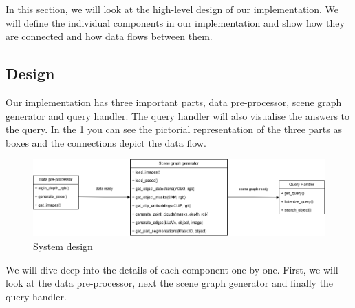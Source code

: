 In this section, we will look at the high-level design of our implementation. We will define the individual components in our
implementation and show how they are connected and how data flows between them.

\subsection{Design}
Our implementation has three important parts, data pre-processor, scene graph generator and query handler. The query handler will also visualise
the answers to the query. In the \cref{fig:system_desgin} you can see the pictorial representation of the three parts as boxes and the connections depict the data flow.
\begin{figure}[ht!]
    \centering
    \includegraphics[width=\textwidth]{content/images/Design.png}
    \caption{System design}
    \label{fig:system_desgin}
\end{figure}

We will dive deep into the details of each component one by one. First, we will look at the data pre-processor, next the scene graph generator and finally 
the query handler.

